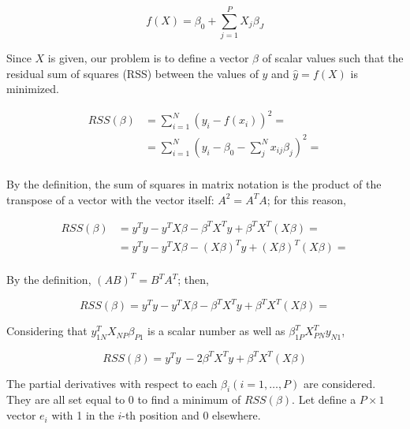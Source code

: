 \begin{equation}
f\left(X\right)=\beta_0+\sum_{j=1}^{P}{X_j\beta_J}
\label{eq_OLS1}
\end{equation}

Since $X$ is given, our problem is to define a vector $\beta$ of scalar values such that the residual sum of squares (RSS) between the values of $y$ and  $\hat{y}=f(X)$ is minimized.

\begin{equation}
\begin{split}
    RSS\left(\beta\right) & =\sum_{i=1}^{N}{\left(y_i-f\left(x_i\right)\right)^2=} \\
    & =\sum_{i=1}^{N}\left(y_i-\beta_0-\sum_{j}^{N}{x_{ij}\beta_j}\right)^2= \\
\end{split}
\label{eq_OLS2}
\end{equation}

By the definition, the sum of squares in matrix notation is the product of the transpose of a vector with the vector itself: $A^2=A^TA$; for this reason,

\begin{equation}
\begin{split}
     RSS\left(\beta\right) & = {y}^T{y}-{y}^T{X}\beta-\beta^T{X}^T{y}+\beta^T{X}^T\left({X}\beta\right)= \\
    & ={y}^T{y}-{y}^T{X}\beta-\left({X}\beta\right)^T{y}+\left({X}\beta\right)^T\left({X}\beta\right)=\\
\end{split}
\label{eq_OLS3}
\end{equation}

By the definition, $\left(AB\right)^T=B^TA^T$; then,

\begin{equation}
     RSS\left(\beta\right) = {y}^T{y}-{y}^T{X}\beta-\beta^T{X}^T{y}+\beta^T{X}^T\left({X}\beta\right)=
\label{eq_OLS4}
\end{equation}

Considering that ${y}_{1N}^T{X}_{NP}\beta_{P1}$ is a scalar number as well as $\beta_{1P}^T{X}_{PN}^T{y}_{N1}$,

\begin{equation}
     RSS\left(\beta\right) =  {y}^T{y}\ -2\beta^T{X}^T{y}+\beta^T{X}^T\left({X}\beta\right)
\label{eq_OLS5}
\end{equation}

The partial derivatives with respect to each $\beta_i (i=1,\ldots,P)$ are considered. They are all set equal to 0 to find a minimum of $RSS\left(\beta\right)$. Let define a $P\times1$ vector $e_i$ with 1 in the $i$-th position and 0 elsewhere. 

